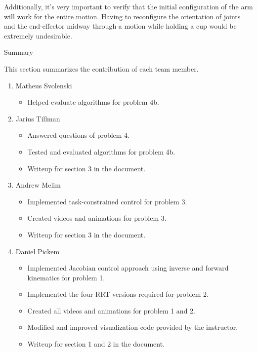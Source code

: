 \documentclass[12pt]{article}
\begin{document}
Additionally, it's very important to verify that the initial configuration of the arm will work for the entire motion. Having to reconfigure the orientation of joints and the end-effector midway through a motion while holding a cup would be extremely undesirable.

\newpage
\begin{center}
\Huge{Summary} 
\end{center}
This section summarizes the contribution of each team member. 

\begin{enumerate}
  \item Matheus Svolenski
    \begin{itemize}
     \item Helped evaluate algorithms for problem 4b.
    \end{itemize}
  \item Jarius Tillman
   \begin{itemize}
     \item Answered questions of problem 4.
     \item Tested and evaluated algorithms for problem 4b.
     \item Writeup for section 3 in the document.
    \end{itemize}
  \item Andrew Melim
    \begin{itemize}
     \item Implemented task-constrained control for problem 3.
     \item Created videos and animations for problem 3.
     \item Writeup for section 3 in the document.
    \end{itemize}

  \item Daniel Pickem
    \begin{itemize}
     \item Implemented Jacobian control approach using inverse and forward kinematics for problem 1.
     \item Implemented the four RRT versions required for problem 2.
     \item Created all videos and animations for problem 1 and 2.
     \item Modified and improved visualization code provided by the instructor.
     \item Writeup for section 1 and 2 in the document.
    \end{itemize}
\end{enumerate}
\end{document}
